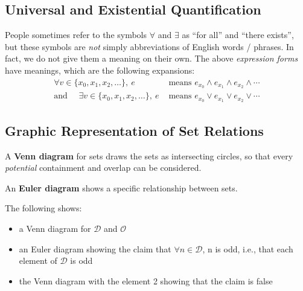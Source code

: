 \documentclass{article}
\begin{document}
\subsection{Universal and Existential Quantification}
People sometimes refer to the symbols $\forall$ and $\exists$ as “for all” and “there exists”, but these symbols are \textit{not} simply abbreviations of
English words / phrases. In fact, we do not give them a meaning on their own.
The above \textit{expression forms} have meanings, which are the following expansions:
\[
\begin{aligned}
\forall v \in \{x_0, x_1, x_2, \ldots\},\ e &\text{ means }
e_{x_0} \wedge e_{x_1} \wedge e_{x_2} \wedge \cdots \\
\text{and }\quad\exists v \in \{x_0, x_1, x_2, \ldots\},\ e &\text{ means }
e_{x_0} \vee e_{x_1} \vee e_{x_2} \vee \cdots
\end{aligned}
\]

\subsection{Graphic Representation of Set Relations}
A \textbf{Venn diagram} for sets draws the sets as intersecting circles, so that every \textit{potential} containment and overlap can be considered.

An \textbf{Euler diagram} shows a specific relationship between sets.

The following shows:
\begin{itemize}
\item a Venn diagram for $\mathcal{D}$ and $\mathcal{O}$
\item an Euler diagram showing the claim that $\forall n\in \mathcal{D}$, n is odd, i.e., that each element of $\mathcal{D}$ is odd
\item the Venn diagram with the element 2 showing that the claim is false
\end{itemize}


\end{document}
